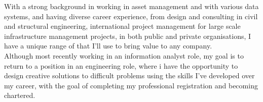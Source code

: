 %
%
%
\par{With a strong background in working in asset management and with various data systems, and having diverse career experience, from design and consulting in civil and structural engineering, international project management for large scale infrastructure management projects, in both public and private organisations, I have a unique range of that I'll use to bring value to any company. \\

Although most recently working in an information analyst role, my goal is to return to a position in an engineering role, where i have the opportunity to design creative solutions to difficult problems using the skills I’ve developed over my career, with the goal of completing my professional registration and becoming chartered. \\

}